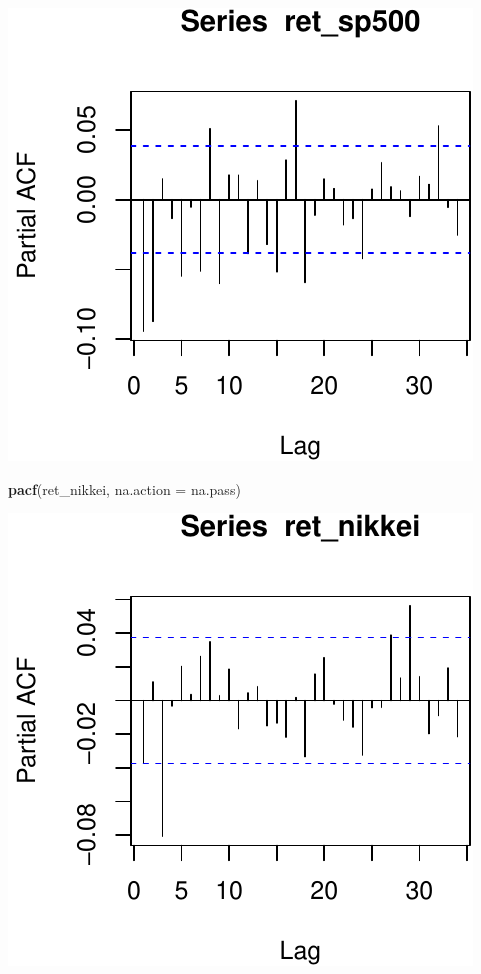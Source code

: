 \documentclass[11pt,]{article}
\newenvironment{Shaded}{\begin{snugshade}}{\end{snugshade}}
\newcommand{\KeywordTok}[1]{\textcolor[rgb]{0.13,0.29,0.53}{\textbf{#1}}}
\newcommand{\DataTypeTok}[1]{\textcolor[rgb]{0.13,0.29,0.53}{#1}}
\newcommand{\NormalTok}[1]{#1}
\begin{document}
\begin{center}\includegraphics{FMC_T4_PhD_ARMA_GARCH_files/figure-latex/PACF-2} \end{center}

\begin{Shaded}
\begin{Highlighting}[]
\KeywordTok{pacf}\NormalTok{(ret_nikkei, }\DataTypeTok{na.action =}\NormalTok{ na.pass)}
\end{Highlighting}
\end{Shaded}

\begin{center}\includegraphics{FMC_T4_PhD_ARMA_GARCH_files/figure-latex/PACF-3} \end{center}
\end{document}
